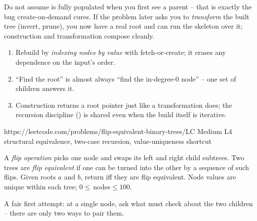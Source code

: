 \begin{warningbox}
Do not assume  is fully populated when you first see a parent -- that
is exactly the bug create-on-demand cures. If the problem later asks you to
\emph{transform} the built tree (invert, prune), you now have a real root and can
run the  skeleton over it; construction and transformation
compose cleanly.
\end{warningbox}

\begin{insightbox}
\begin{enumerate}[nosep, leftmargin=1.6em]
  \item Rebuild by \emph{indexing nodes by value} with fetch-or-create; it erases
        any dependence on the input's order.
  \item ``Find the root'' is almost always ``find the in-degree-$0$ node'' -- one
        set of children answers it.
  \item Construction returns a root pointer just like a transformation does; the
        recursion discipline () is shared even when the
        build itself is iterative.
\end{enumerate}
\end{insightbox}


  {https://leetcode.com/problems/flip-equivalent-binary-trees/}{LC Medium L4}
  {structural equivalence, two-case recursion, value-uniqueness shortcut}

\begin{problemstatement}
A \emph{flip operation} picks one node and swaps its left and right child
subtrees. Two trees are \emph{flip equivalent} if one can be turned into the other
by a sequence of such flips. Given roots $a$ and $b$, return  iff they
are flip equivalent. Node values are unique within each tree; $0\le$\,nodes$\le100$.
\end{problemstatement}

\begin{attemptgate}
A fair first attempt: at a single node, ask what  must check about
the two children -- there are only two ways to pair them.
\end{attemptgate}

